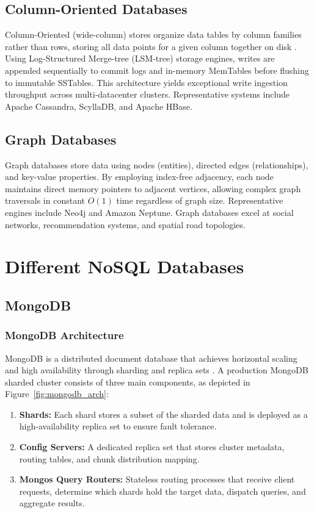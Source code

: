 \documentclass[11pt,a4paper]{article}
\begin{document}
\subsection{Column-Oriented Databases}
Column-Oriented (wide-column) stores organize data tables by column families rather than rows, storing all data points for a given column together on disk \citep{chang2008}. Using Log-Structured Merge-tree (LSM-tree) storage engines, writes are appended sequentially to commit logs and in-memory MemTables before flushing to immutable SSTables. This architecture yields exceptional write ingestion throughput across multi-datacenter clusters. Representative systems include Apache Cassandra, ScyllaDB, and Apache HBase.

\subsection{Graph Databases}
Graph databases store data using nodes (entities), directed edges (relationships), and key-value properties. By employing index-free adjacency, each node maintains direct memory pointers to adjacent vertices, allowing complex graph traversals in constant $O(1)$ time regardless of graph size. Representative engines include Neo4j and Amazon Neptune. Graph databases excel at social networks, recommendation systems, and spatial road topologies.

\section{Different NoSQL Databases}

\subsection{MongoDB}

\subsubsection{MongoDB Architecture}
MongoDB is a distributed document database that achieves horizontal scaling and high availability through sharding and replica sets \citep{chodorow2019}. A production MongoDB sharded cluster consists of three main components, as depicted in Figure~\ref{fig:mongodb_arch}:
\begin{enumerate}[noitemsep]
    \item \textbf{Shards:} Each shard stores a subset of the sharded data and is deployed as a high-availability replica set to ensure fault tolerance.
    \item \textbf{Config Servers:} A dedicated replica set that stores cluster metadata, routing tables, and chunk distribution mapping.
    \item \textbf{Mongos Query Routers:} Stateless routing processes that receive client requests, determine which shards hold the target data, dispatch queries, and aggregate results.
\end{enumerate}
\end{document}
